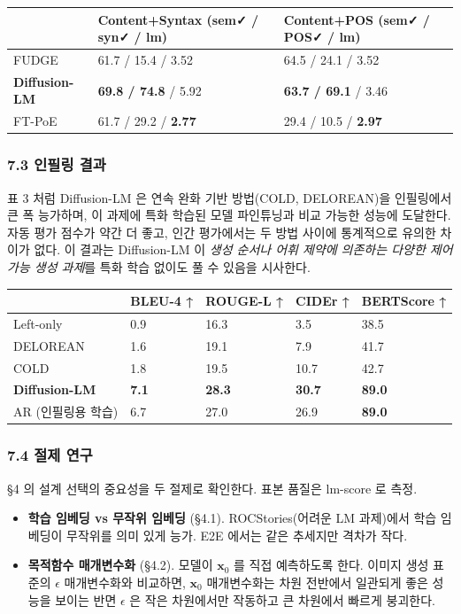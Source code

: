 \documentclass[
]{article}
\providecommand{\tightlist}{%
  \setlength{\itemsep}{0pt}\setlength{\parskip}{0pt}}
\begin{document}
\begin{longtable}[]{@{}lll@{}}
\toprule()
& Content+Syntax (sem✓ / syn✓ / lm) & Content+POS (sem✓ / POS✓ / lm) \\
\midrule()
\endhead
FUDGE & 61.7 / 15.4 / 3.52 & 64.5 / 24.1 / 3.52 \\
\textbf{Diffusion-LM} & \textbf{69.8 / 74.8} / 5.92 & \textbf{63.7 /
69.1} / 3.46 \\
FT-PoE & 61.7 / 29.2 / \textbf{2.77} & 29.4 / 10.5 / \textbf{2.97} \\
\bottomrule()
\end{longtable}

\hypertarget{uxc778uxd544uxb9c1-uxacb0uxacfc}{%
\subsubsection{7.3 인필링 결과}\label{uxc778uxd544uxb9c1-uxacb0uxacfc}}

표 3 처럼 Diffusion-LM 은 연속 완화 기반 방법(COLD, DELOREAN)을
인필링에서 큰 폭 능가하며, 이 과제에 특화 학습된 모델 파인튜닝과 비교
가능한 성능에 도달한다. 자동 평가 점수가 약간 더 좋고, 인간 평가에서는
두 방법 사이에 통계적으로 유의한 차이가 없다. 이 결과는 Diffusion-LM 이
\emph{생성 순서나 어휘 제약에 의존하는 다양한 제어 가능 생성 과제}를
특화 학습 없이도 풀 수 있음을 시사한다.

\begin{longtable}[]{@{}lllll@{}}
\toprule()
& BLEU-4 ↑ & ROUGE-L ↑ & CIDEr ↑ & BERTScore ↑ \\
\midrule()
\endhead
Left-only & 0.9 & 16.3 & 3.5 & 38.5 \\
DELOREAN & 1.6 & 19.1 & 7.9 & 41.7 \\
COLD & 1.8 & 19.5 & 10.7 & 42.7 \\
\textbf{Diffusion-LM} & \textbf{7.1} & \textbf{28.3} & \textbf{30.7} &
\textbf{89.0} \\
AR (인필링용 학습) & 6.7 & 27.0 & 26.9 & \textbf{89.0} \\
\bottomrule()
\end{longtable}

\hypertarget{uxc808uxc81c-uxc5f0uxad6c}{%
\subsubsection{7.4 절제 연구}\label{uxc808uxc81c-uxc5f0uxad6c}}

§4 의 설계 선택의 중요성을 두 절제로 확인한다. 표본 품질은 lm-score 로
측정.

\begin{itemize}
\tightlist
\item
  \textbf{학습 임베딩 vs 무작위 임베딩} (§4.1). ROCStories(어려운 LM
  과제)에서 학습 임베딩이 무작위를 의미 있게 능가. E2E 에서는 같은
  추세지만 격차가 작다.
\item
  \textbf{목적함수 매개변수화} (§4.2). 모델이 \(\mathbf{x}_0\) 를 직접
  예측하도록 한다. 이미지 생성 표준의 \(\epsilon\) 매개변수화와
  비교하면, \(\mathbf{x}_0\) 매개변수화는 차원 전반에서 일관되게 좋은
  성능을 보이는 반면 \(\epsilon\) 은 작은 차원에서만 작동하고 큰
  차원에서 빠르게 붕괴한다.
\end{itemize}
\end{document}
